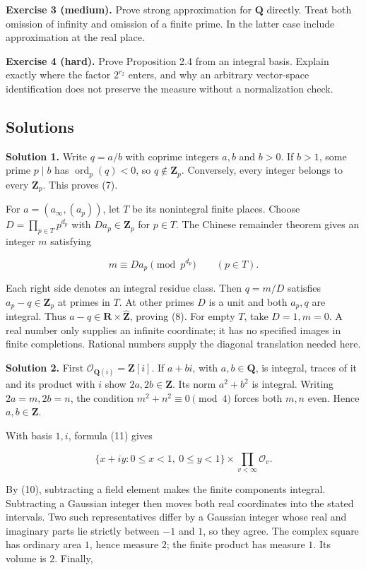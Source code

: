 \documentclass[
  english,
  11pt,
  a4paper,
]{article}
\begin{document}
\textbf{Exercise 3 (medium).} Prove strong approximation for
\(\mathbf Q\) directly. Treat both omission of infinity and omission of
a finite prime. In the latter case include approximation at the real
place.

\textbf{Exercise 4 (hard).} Prove Proposition 2.4 from an integral
basis. Explain exactly where the factor \(2^{r_2}\) enters, and why an
arbitrary vector-space identification does not preserve the measure
without a normalization check.

\subsection{Solutions}\label{NT-ADL-02--solutions}

\textbf{Solution 1.} Write \(q=a/b\) with coprime integers \(a,b\) and
\(b>0\). If \(b>1\), some prime \(p\mid b\) has
\(\operatorname{ord}_p(q)<0\), so \(q\notin\mathbf Z_p\). Conversely,
every integer belongs to every \(\mathbf Z_p\). This proves (7).

For \(a=(a_\infty,(a_p))\), let \(T\) be its nonintegral finite places.
Choose \(D=\prod_{p\in T}p^{d_p}\) with \(D a_p\in\mathbf Z_p\) for
\(p\in T\). The Chinese remainder theorem gives an integer \(m\)
satisfying

\[m\equiv D a_p\pmod{p^{d_p}}\qquad(p\in T).\]

Each right side denotes an integral residue class. Then \(q=m/D\)
satisfies \(a_p-q\in\mathbf Z_p\) at primes in \(T\). At other primes
\(D\) is a unit and both \(a_p,q\) are integral. Thus
\(a-q\in\mathbf R\times\widehat{\mathbf Z}\), proving (8). For empty
\(T\), take \(D=1,m=0\). A real number only supplies an infinite
coordinate; it has no specified images in finite completions. Rational
numbers supply the diagonal translation needed here.

\textbf{Solution 2.} First \(\mathcal O_{\mathbf Q(i)}=\mathbf Z[i]\).
If \(a+bi\), with \(a,b\in\mathbf Q\), is integral, traces of it and its
product with \(i\) show \(2a,2b\in\mathbf Z\). Its norm \(a^2+b^2\) is
integral. Writing \(2a=m,2b=n\), the condition \(m^2+n^2\equiv0\pmod4\)
forces both \(m,n\) even. Hence \(a,b\in\mathbf Z\).

With basis \(1,i\), formula (11) gives

\[\{x+iy:0\leq x<1,\ 0\leq y<1\}
\times\prod_{v<\infty}\mathcal O_v.\]

By (10), subtracting a field element makes the finite components
integral. Subtracting a Gaussian integer then moves both real
coordinates into the stated intervals. Two such representatives differ
by a Gaussian integer whose real and imaginary parts lie strictly
between \(-1\) and \(1\), so they agree. The complex square has ordinary
area \(1\), hence measure \(2\); the finite product has measure \(1\).
Its volume is \(2\). Finally,
\end{document}
